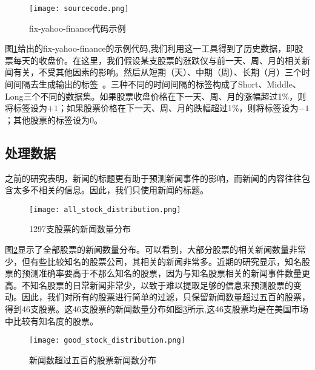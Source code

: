 %	

\begin{figure}[H]
	\centering 
	\texttt{[image: sourcecode.png]}
	\caption[]{fix-yahoo-finance代码示例}
	\label{fig:fix-yahoo-finance-source-code}
\end{figure}

图\ref{fig:fix-yahoo-finance-source-code}给出的fix-yahoo-finance的示例代码,我们利用这一工具得到了历史数据，即股票每天的收盘价。在这里，我们假设某支股票的涨跌仅与前一天、周、月的相关新闻有关，不受其他因素的影响。然后从短期（天）、中期（周）、长期（月）三个时间间隔去生成输出的标签~\cite{ding2014using}。三种不同的时间间隔的标签构成了Short、Middle、Long三个不同的数据集。如果股票收盘价格在下一天、周、月的涨幅超过1\%，则将标签设为$+1$；如果股票价格在下一天、周、月的跌幅超过1\%，则将标签设为$-1$；其他股票的标签设为$0$。

\subsection{处理数据}

之前的研究表明，新闻的标题更有助于预测新闻事件的影响，而新闻的内容往往包含太多不相关的信息。因此，我们只使用新闻的标题\cite{ding2014using}。
\begin{figure}[ht]
	\centering
	\texttt{[image: all\_stock\_distribution.png]}
	\caption{1297支股票的新闻数量分布}
	\label{fig:all-stock-distribution}
\end{figure}
图\ref{fig:all-stock-distribution}显示了全部股票的新闻数量分布。可以看到，大部分股票的相关新闻数量非常少，但有些比较知名的股票公司，其相关的新闻非常多。近期的研究\cite{ding2014using}显示，知名股票的预测准确率要高于不那么知名的股票，因为与知名股票相关的新闻事件数量更高。不知名股票的日常新闻非常少，以致于难以提取足够的信息来预测股票的变动。因此，我们对所有的股票进行简单的过滤，只保留新闻数量超过五百的股票，得到46支股票。这46支股票的新闻数量分布如图\ref{fig:good_stock_distribution}所示,这46支股票均是在美国市场中比较有知名度的股票。

\begin{figure}[ht]
	\centering 
	\texttt{[image: good\_stock\_distribution.png]}
	\caption{新闻数超过五百的股票新闻数分布}
	\label{fig:good_stock_distribution}
\end{figure}


